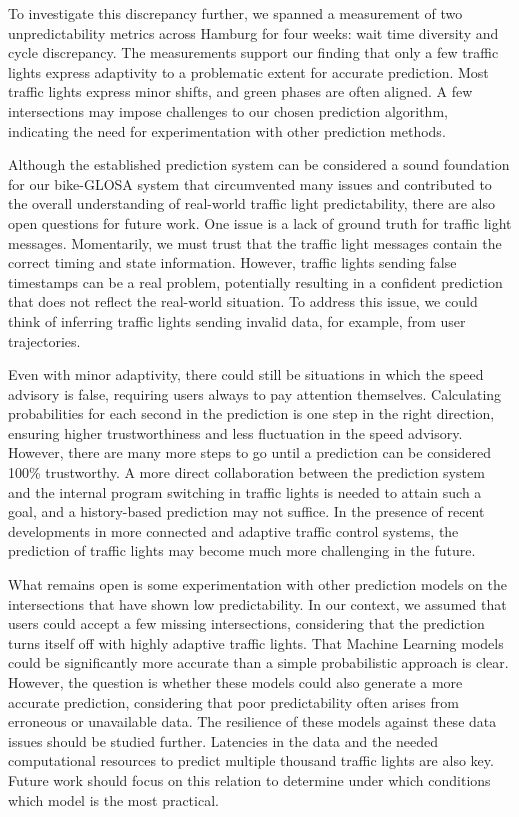 To investigate this discrepancy further, we spanned a measurement of two unpredictability metrics across Hamburg for four weeks: wait time diversity and cycle discrepancy. The measurements support our finding that only a few traffic lights express adaptivity to a problematic extent for accurate prediction. Most traffic lights express minor shifts, and green phases are often aligned. A few intersections may impose challenges to our chosen prediction algorithm, indicating the need for experimentation with other prediction methods.

Although the established prediction system can be considered a sound foundation for our bike-GLOSA system that circumvented many issues and contributed to the overall understanding of real-world traffic light predictability, there are also open questions for future work. One issue is a lack of ground truth for traffic light messages. Momentarily, we must trust that the traffic light messages contain the correct timing and state information. However, traffic lights sending false timestamps can be a real problem, potentially resulting in a confident prediction that does not reflect the real-world situation. To address this issue, we could think of inferring traffic lights sending invalid data, for example, from user trajectories. 

Even with minor adaptivity, there could still be situations in which the speed advisory is false, requiring users always to pay attention themselves. Calculating probabilities for each second in the prediction is one step in the right direction, ensuring higher trustworthiness and less fluctuation in the speed advisory. However, there are many more steps to go until a prediction can be considered 100\% trustworthy. A more direct collaboration between the prediction system and the internal program switching in traffic lights is needed to attain such a goal, and a history-based prediction may not suffice. In the presence of recent developments in more connected and adaptive traffic control systems, the prediction of traffic lights may become much more challenging in the future.

What remains open is some experimentation with other prediction models on the intersections that have shown low predictability. In our context, we assumed that users could accept a few missing intersections, considering that the prediction turns itself off with highly adaptive traffic lights. That Machine Learning models could be significantly more accurate than a simple probabilistic approach is clear. However, the question is whether these models could also generate a more accurate prediction, considering that poor predictability often arises from erroneous or unavailable data. The resilience of these models against these data issues should be studied further. Latencies in the data and the needed computational resources to predict multiple thousand traffic lights are also key. Future work should focus on this relation to determine under which conditions which model is the most practical.
